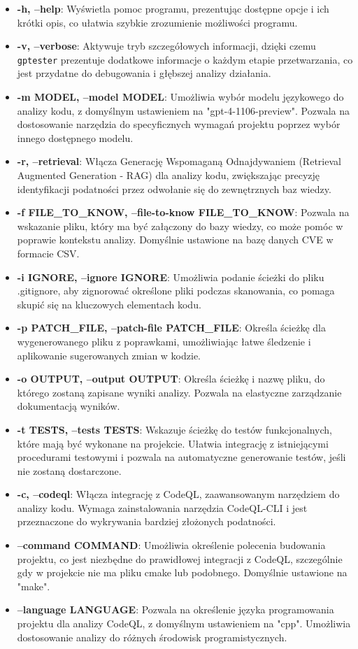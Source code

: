 \begin{itemize}
    \item \textbf{-h, --help}: Wyświetla pomoc programu, prezentując dostępne opcje i ich krótki opis, co ułatwia szybkie zrozumienie możliwości programu.
    \item \textbf{-v, --verbose}: Aktywuje tryb szczegółowych informacji, dzięki czemu \texttt{gptester} prezentuje dodatkowe informacje o każdym etapie przetwarzania, co jest przydatne do debugowania i głębszej analizy działania.
    \item \textbf{-m MODEL, --model MODEL}: Umożliwia wybór modelu językowego do analizy kodu, z domyślnym ustawieniem na "gpt-4-1106-preview". Pozwala na dostosowanie narzędzia do specyficznych wymagań projektu poprzez wybór innego dostępnego modelu.
    \item \textbf{-r, --retrieval}: Włącza Generację Wspomaganą Odnajdywaniem (Retrieval Augmented Generation - RAG) dla analizy kodu, zwiększając precyzję identyfikacji podatności przez odwołanie się do zewnętrznych baz wiedzy.
    \item \textbf{-f FILE\_TO\_KNOW, --file-to-know FILE\_TO\_KNOW}: Pozwala na wskazanie pliku, który ma być załączony do bazy wiedzy, co może pomóc w poprawie kontekstu analizy. Domyślnie ustawione na bazę danych CVE w formacie CSV.
    \item \textbf{-i IGNORE, --ignore IGNORE}: Umożliwia podanie ścieżki do pliku .gitignore, aby zignorować określone pliki podczas skanowania, co pomaga skupić się na kluczowych elementach kodu.
    \item \textbf{-p PATCH\_FILE, --patch-file PATCH\_FILE}: Określa ścieżkę dla wygenerowanego pliku z poprawkami, umożliwiając łatwe śledzenie i aplikowanie sugerowanych zmian w kodzie.
    \item \textbf{-o OUTPUT, --output OUTPUT}: Określa ścieżkę i nazwę pliku, do którego zostaną zapisane wyniki analizy. Pozwala na elastyczne zarządzanie dokumentacją wyników.
    \item \textbf{-t TESTS, --tests TESTS}: Wskazuje ścieżkę do testów funkcjonalnych, które mają być wykonane na projekcie. Ułatwia integrację z istniejącymi procedurami testowymi i pozwala na automatyczne generowanie testów, jeśli nie zostaną dostarczone.
    \item \textbf{-c, --codeql}: Włącza integrację z CodeQL, zaawansowanym narzędziem do analizy kodu. Wymaga zainstalowania narzędzia CodeQL-CLI i jest przeznaczone do wykrywania bardziej złożonych podatności.
    \item \textbf{--command COMMAND}: Umożliwia określenie polecenia budowania projektu, co jest niezbędne do prawidłowej integracji z CodeQL, szczególnie gdy w projekcie nie ma pliku cmake lub podobnego. Domyślnie ustawione na "make".
    \item \textbf{--language LANGUAGE}: Pozwala na określenie języka programowania projektu dla analizy CodeQL, z domyślnym ustawieniem na "cpp". Umożliwia dostosowanie analizy do różnych środowisk programistycznych.
\end{itemize}
